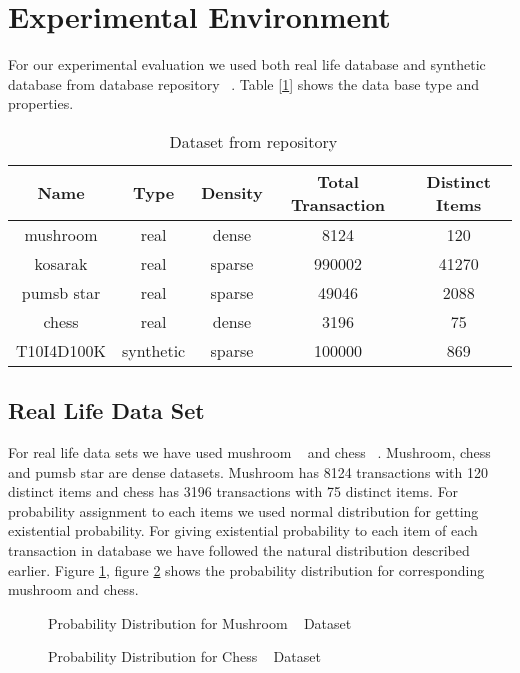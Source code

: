 \section{Experimental Environment}
For our experimental evaluation we used both real life database and synthetic database from database repository ~\cite{dataset}. Table [\ref{table:dataset}] shows the data base type and properties.
		\begin{table}[h]
		\centering
		\begin{tabular}{|c|c|c|c|c|}
		\hline 
		Name		&	Type	&	Density	&	Total Transaction 	&	Distinct Items	\\ \hline \hline
		mushroom	&	real	&	dense	&	8124	&	120							\\ \hline
		kosarak		&	real	&	sparse	&	990002	&	41270						\\ \hline
		pumsb star	&	real	&	sparse	&	49046	&	2088						\\ \hline
		chess		&	real	&	dense	&	3196	&	75							\\ \hline
		T10I4D100K	&	synthetic	&	sparse	&	100000	&	869						\\ \hline
			\end{tabular}
		\caption{Dataset from repository ~\cite{dataset}}
		\label{table:dataset}
		\end{table}


\subsection{Real Life Data Set}
For real life data sets we have used mushroom ~\cite{dataset} and chess ~\cite{dataset}. Mushroom, chess and pumsb star are dense datasets. Mushroom has 8124 transactions with 120 distinct items and chess has 3196 transactions with 75 distinct items. For probability assignment to each items we used normal distribution for getting existential probability. For giving existential probability to each item of each transaction in database we have followed the natural distribution described earlier. Figure \ref{result:g_dataset_mushroom}, figure \ref{result:g_dataset_chess} shows the probability distribution for corresponding mushroom and chess.
		\begin{figure}[h]
		\centering
			
		\caption{Probability Distribution for Mushroom ~\cite{dataset} Dataset}
		\label{result:g_dataset_mushroom}
		\end{figure}
		
		\begin{figure}[h]
		\centering
			
		\caption{Probability Distribution for Chess ~\cite{dataset} Dataset}
		\label{result:g_dataset_chess}
		\end{figure}

